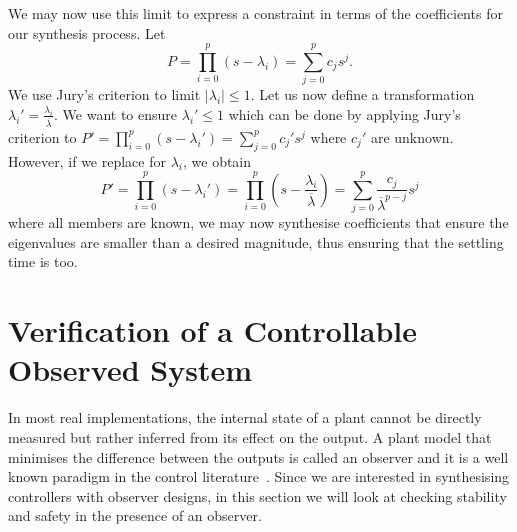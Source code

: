 \documentclass[sigconf]{llncs}
\begin{document}
%
We may now use this limit to express a constraint in terms of the
coefficients for our synthesis process.  Let
%
\begin{equation}
P=\prod_{i=0}^p (s-\lambda_i)=\sum_{j=0}^p c_js^j.
\end{equation}
%
We use Jury's criterion to limit $|\lambda_i| \leq 1$.  Let us now define a
transformation $\lambda_i'=\frac{\lambda_i}{\overline{\lambda}}$.  We want
to ensure $\lambda_i' \leq 1$ which can be done by applying Jury's criterion
to $P'=\prod_{i=0}^p (s-\lambda_i')=\sum_{j=0}^p c_j's^j$ where $c_j'$ are
unknown.  However, if we replace for $\lambda_i$, we obtain
%
\begin{equation}
P'=\prod_{i=0}^p (s-\lambda_i')=\prod_{i=0}^p \left(s-\frac{\lambda_i}{\overline{\lambda}}\right)=\sum_{j=0}^p \frac{c_j}{\overline{\lambda}^{p-j}}s^j
\end{equation}
%
where all members are known, we may now synthesise coefficients that ensure
the eigenvalues are smaller than a desired magnitude, thus ensuring that the
settling time is too.

\section{Verification of a Controllable Observed System}\label{sec:cof_verification}

In most real implementations, the internal state of a plant cannot be
directly measured but rather inferred from its
effect on the output. A plant model that minimises the difference
between the outputs is called an observer and it is a well known
paradigm in the control literature~\cite{astrom1997computer}. Since we
are interested in synthesising controllers with observer designs, in this
section we will look at checking stability and safety in the presence of an observer.

\end{document}
